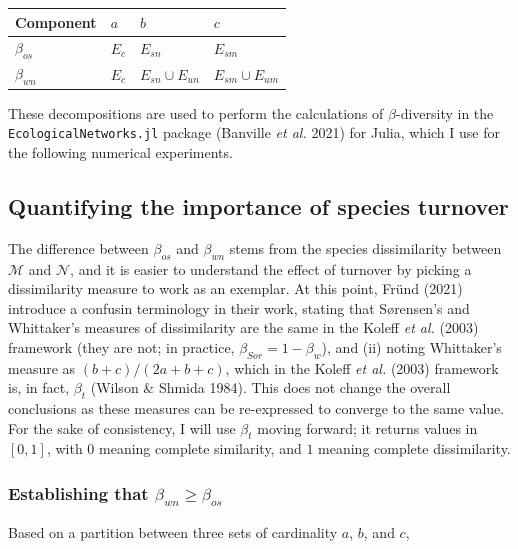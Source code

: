 \documentclass[11pt]{article}
\begin{document}
\begin{longtable}[]{@{}llll@{}}
\toprule
Component & \(a\) & \(b\) & \(c\)\tabularnewline
\midrule
\endhead
\(\beta_{os}\) & \(E_c\) & \(E_{sn}\) & \(E_{sm}\)\tabularnewline
\(\beta_{wn}\) & \(E_c\) & \(E_{sn} \cup E_{un}\) &
\(E_{sm} \cup E_{um}\)\tabularnewline
\bottomrule
\end{longtable}

These decompositions are used to perform the calculations of
\(\beta\)-diversity in the \texttt{EcologicalNetworks.jl} package
(Banville \emph{et al.} 2021) for Julia, which I use for the following
numerical experiments.

\hypertarget{quantifying-the-importance-of-species-turnover}{%
\subsection{Quantifying the importance of species
turnover}\label{quantifying-the-importance-of-species-turnover}}

The difference between \(\beta_{os}\) and \(\beta_{wn}\) stems from the
species dissimilarity between \(\mathcal{M}\) and \(\mathcal{N}\), and
it is easier to understand the effect of turnover by picking a
dissimilarity measure to work as an exemplar. At this point, Fründ
(2021) introduce a confusin terminology in their work, stating that
S\o rensen's and Whittaker's measures of dissimilarity are the same in
the Koleff \emph{et al.} (2003) framework (they are not; in practice,
\(\beta_{Sor}=1-\beta_{w}\)), and (ii) noting Whittaker's measure as
\((b+c)/(2a+b+c)\), which in the Koleff \emph{et al.} (2003) framework
is, in fact, \(\beta_t\) (Wilson \& Shmida 1984). This does not change
the overall conclusions as these measures can be re-expressed to
converge to the same value. For the sake of consistency, I will use
\(\beta_t\) moving forward; it returns values in \([0,1]\), with \(0\)
meaning complete similarity, and \(1\) meaning complete dissimilarity.

\hypertarget{establishing-that-beta_wn-ge-beta_os}{%
\subsubsection{\texorpdfstring{Establishing that
\(\beta_{wn} \ge \beta_{os}\)}{Establishing that \textbackslash beta\_\{wn\} \textbackslash ge \textbackslash beta\_\{os\}}}\label{establishing-that-beta_wn-ge-beta_os}}

Based on a partition between three sets of cardinality \(a\), \(b\), and
\(c\),
\end{document}
